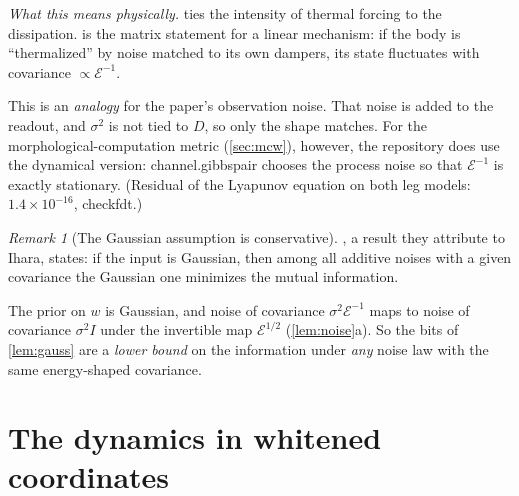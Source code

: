 \documentclass[11pt]{article}
\theoremstyle{definition}
\theoremstyle{remark}
\newtheorem{remark}[theorem]{Remark}
\newcommand{\Em}{\mathcal{E}}         %
\newcommand{\codeus}{\textunderscore\allowbreak}
\newcommand{\code}[1]{{\ttfamily\let\_\codeus\hyphenchar\font=-1 #1}}
\newcommand{\phys}[1]{\par\smallskip\noindent\textit{What this means physically.} #1\par}
\begin{document}
\phys{\citet{kubo1966fluctuation} ties the intensity of thermal forcing to the dissipation.
\Cref{prop:fdt} is the matrix statement for a linear mechanism: if the body is
``thermalized'' by noise matched to its own dampers, its state fluctuates with covariance
$\propto\Em^{-1}$.

This is an \emph{analogy} for the paper's observation noise. That noise is added to the
readout, and $\sigma^2$ is not tied to $D$, so only the shape matches. For the
morphological-computation metric (\cref{sec:mcw}), however, the repository does use the
dynamical version: \code{channel.gibbs\_pair} chooses the process noise so that
$\Em^{-1}$ is exactly stationary. (Residual of the Lyapunov equation on both leg models:
$1.4\times10^{-16}$, \code{check\_fdt}.)}

\begin{remark}[The Gaussian assumption is conservative]\label{rem:worst}
\citet[Lemma~II.2]{diggavi2001worst}, a result they attribute to Ihara, states: if the
input is Gaussian, then among all additive noises with a given covariance the Gaussian
one minimizes the mutual information.

The prior on $w$ is Gaussian, and noise of covariance $\sigma^2\Em^{-1}$ maps to noise of
covariance $\sigma^2I$ under the invertible map $\Em^{1/2}$ (\cref{lem:noise}a). So the
bits of \cref{lem:gauss} are a \emph{lower bound} on the information under \emph{any}
noise law with the same energy-shaped covariance.
\end{remark}

\section{The dynamics in whitened coordinates}
\label{sec:structure}
\end{document}
